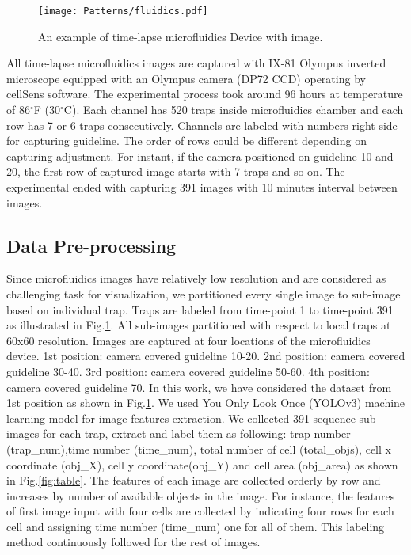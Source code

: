 \documentclass[conference]{IEEEtran}
\begin{document}
\begin{figure}
\centering
\texttt{[image: Patterns/fluidics.pdf]}
\caption{ An example of time-lapse microfluidics Device with image.}
\label{fig:micro}
\end{figure}

All time-lapse microfluidics images are captured with IX-81 Olympus inverted microscope equipped with an Olympus camera (DP72 CCD) operating by cellSens software. The experimental process took around 96 hours at temperature of 86$^{\circ}$F (30$^{\circ}$C). Each channel has 520 traps inside microfluidics chamber and each row has 7 or 6 traps consecutively. Channels are labeled with numbers right-side for capturing guideline. The order of rows could be different depending on capturing adjustment. For instant, if the camera positioned on guideline 10 and 20, the first row of captured image starts with 7 traps and so on. The experimental ended with capturing 391 images with 10 minutes interval between images. 

\subsection{Data Pre-processing}
Since microfluidics images have relatively low resolution and are considered as challenging task for visualization, we partitioned every single image to sub-image based on individual trap. Traps are labeled from time-point 1 to time-point 391 as illustrated in Fig.\ref{fig:micro}. All sub-images partitioned with respect to local traps at 60x60 resolution. Images are captured at four locations of the microfluidics device. 1st position: camera covered guideline 10-20. 2nd position: camera covered guideline 30-40. 3rd position: camera covered guideline 50-60. 4th position: camera covered guideline 70. In this work, we have considered the dataset from 1st position as shown in Fig.\ref{fig:micro}. We used You Only Look Once (YOLOv3) \cite{ref20} machine learning model for image features extraction. We collected 391 sequence sub-images for each trap, extract and label them as following: trap number (trap\_num),time number (time\_num), total number of cell (total\_objs), cell x coordinate (obj\_X), cell y coordinate(obj\_Y) and cell area (obj\_area) as shown in Fig.\ref{fig:table}. The features of each image are collected orderly by row and increases by number of available objects in the image. For instance, the features of first image input with four cells are collected by indicating four rows for each cell and assigning time number (time\_num) one for all of them. This labeling method continuously followed for the rest of images.
\end{document}
